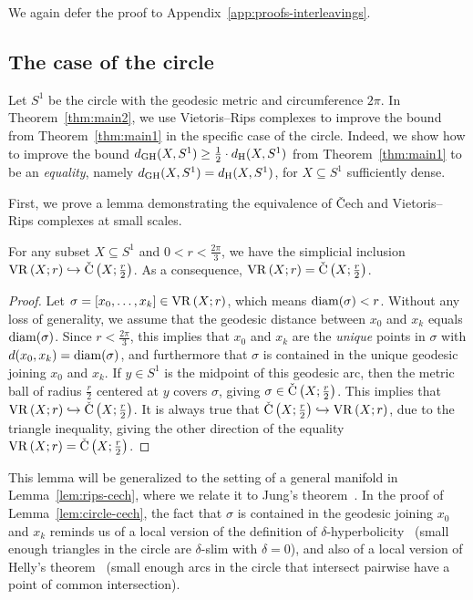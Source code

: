 \documentclass[11pt, reqno, english]{amsart}
\begin{document}
We again defer the proof to Appendix~\ref{app:proofs-interleavings}.


\subsection*{The case of the circle}

Let $S^1$ be the circle with the geodesic metric and circumference $2\pi$.
In Theorem~\ref{thm:main2}, we use Vietoris--Rips complexes to improve the bound from Theorem~\ref{thm:main1} in the specific case of the circle. 
Indeed, we show how to improve the bound $d_{\mathrm{GH}}(X,S^1) \ge \frac{1}{2} \cdot d_{\mathrm{H}}(X,S^1)$ from Theorem~\ref{thm:main1} to be an \emph{equality}, namely $d_{\mathrm{GH}}(X,S^1) = d_{\mathrm{H}}(X,S^1)$, for $X\subseteq S^1$ sufficiently dense.

First, we prove a lemma demonstrating the equivalence of \v{C}ech and Vietoris--Rips complexes at small scales. 

\vspace{3mm}
\begin{lemma}
\label{lem:circle-cech}
For any subset $X\subseteq S^1$ and $0<r<\frac{2\pi}{3}$, we have the simplicial inclusion $\mathrm{VR}\left(X;r\right)\hookrightarrow\mathrm{\check{C}}\left(X;\frac{r}{2}\right)$. 
As a consequence, $\mathrm{VR}\left(X;r\right)=\mathrm{\check{C}}\left(X;\frac{r}{2}\right)$.
\end{lemma}

\begin{proof}
Let $\sigma=[x_0,\ldots,x_k]\in\mathrm{VR}\left(X;r\right)$, which means $\mathrm{diam}(\sigma) < r$. 
Without any loss of generality, we assume that the geodesic distance between $x_0$ and $x_k$ equals $\mathrm{diam}(\sigma)$.
Since $r<\frac{2\pi}{3}$, this implies that $x_0$ and $x_k$ are the \emph{unique} points in $\sigma$ with $d(x_0,x_k)=\mathrm{diam}(\sigma)$, and furthermore that $\sigma$ is contained in the unique geodesic joining $x_0$ and $x_k$.
If $y\in S^1$ is the midpoint of this geodesic arc, then the metric ball 
of radius $\frac{r}{2}$ centered at $y$ covers $\sigma$, giving $\sigma\in\mathrm{\check{C}}\left(X;\frac{r}{2}\right)$.
This implies that $\mathrm{VR}\left(X;r\right)\hookrightarrow\mathrm{\check{C}}\left(X;\frac{r}{2}\right)$.
It is always true that $\mathrm{\check{C}}\left(X;\frac{r}{2}\right)\hookrightarrow\mathrm{VR}\left(X;r\right)$, due to the triangle inequality, giving the other direction of the equality $\mathrm{VR}\left(X;r\right)=\mathrm{\check{C}}\left(X;\frac{r}{2}\right)$.
\end{proof}

This lemma will be generalized to the setting of a general manifold in Lemma~\ref{lem:rips-cech}, where we relate it to Jung's theorem~\cite{danzer1963helly}.
In the proof of Lemma~\ref{lem:circle-cech}, the fact that $\sigma$ is contained in the geodesic joining $x_0$ and $x_k$ reminds us of a local version of the definition of $\delta$-hyperbolicity~\cite{bridson2011metric} (small enough triangles in the circle are $\delta$-slim with $\delta=0$), and also of a local version of Helly's theorem~\cite{danzer1963helly,de2019discrete} (small enough arcs in the circle that intersect pairwise have a point of common intersection).
\end{document}

